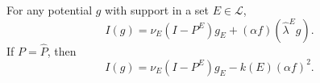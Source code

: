 For any potential $g$ with support in a set $E \in \mathcal{L}$,
$$I(g) = \nu_E(I - P^E)g_E + (\alpha f)(\hat{\lambda}^E g).$$
If $P = \hat{P}$, then
$$I(g) = \nu_E(I - P^E)g_E - k(E)(\alpha f)^2.$$
